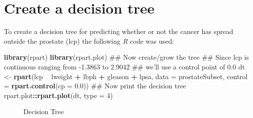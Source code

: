 \documentclass[]{article}
\newenvironment{Shaded}{\begin{snugshade}}{\end{snugshade}}
\newcommand{\KeywordTok}[1]{\textcolor[rgb]{0.13,0.29,0.53}{\textbf{#1}}}
\newcommand{\DataTypeTok}[1]{\textcolor[rgb]{0.13,0.29,0.53}{#1}}
\newcommand{\DecValTok}[1]{\textcolor[rgb]{0.00,0.00,0.81}{#1}}
\newcommand{\FloatTok}[1]{\textcolor[rgb]{0.00,0.00,0.81}{#1}}
\newcommand{\StringTok}[1]{\textcolor[rgb]{0.31,0.60,0.02}{#1}}
\newcommand{\OperatorTok}[1]{\textcolor[rgb]{0.81,0.36,0.00}{\textbf{#1}}}
\newcommand{\NormalTok}[1]{#1}
\renewcommand{\&}{and}
\begin{document}
\section{Create a decision tree}\label{create-a-decision-tree}

To create a decision tree for predicting whether or not the cancer has
spread outside the prostate (lcp) the following \emph{R} code was used:

\begin{Shaded}
\begin{Highlighting}[]
\KeywordTok{library}\NormalTok{(rpart)}
\KeywordTok{library}\NormalTok{(rpart.plot)}
\NormalTok{## Now create/grow the tree}
\NormalTok{## Since lcp is continuous ranging from -1.3863 to 2.9042 }
\NormalTok{## we'll use a control point of 0.0}
\NormalTok{dt <-}\StringTok{ }\KeywordTok{rpart}\NormalTok{(lcp }\OperatorTok{~}\StringTok{ }\NormalTok{lweight }\OperatorTok{+}\StringTok{ }\NormalTok{lbph }\OperatorTok{+}\StringTok{ }\NormalTok{gleason }\OperatorTok{+}\StringTok{ }\NormalTok{lpsa, }\DataTypeTok{data =}\NormalTok{ prostateSubset, }
            \DataTypeTok{control =} \KeywordTok{rpart.control}\NormalTok{(}\DataTypeTok{cp =} \FloatTok{0.0}\NormalTok{))}
\NormalTok{## Now print the decision tree}
\NormalTok{rpart.plot}\OperatorTok{::}\KeywordTok{rpart.plot}\NormalTok{(dt, }\DataTypeTok{type =} \DecValTok{4}\NormalTok{)}
\end{Highlighting}
\end{Shaded}

\begin{figure}[htp]
\caption{Decision Tree}
\end{figure}
\end{document}

